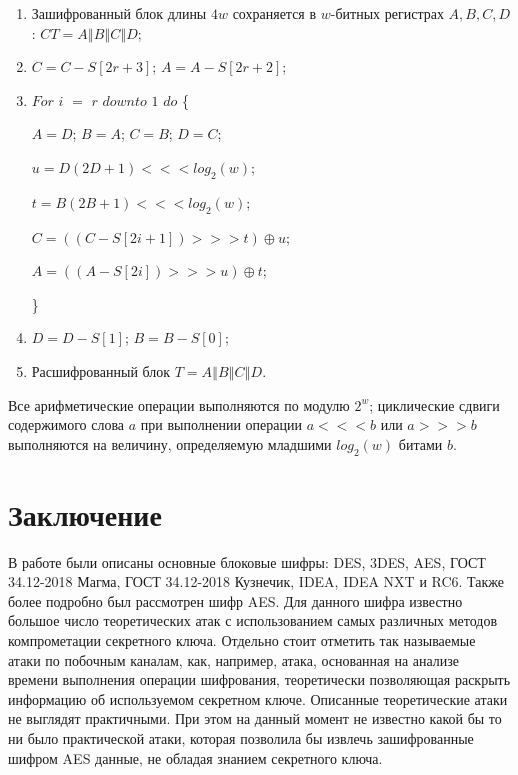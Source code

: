 \documentclass{./civarticle}
\begin{document}
\begin{enumerate}
    \item Зашифрованный блок длины $4w$ сохраняется в $w$-битных регистрах $A, B, C, D$: $CT = A \mathbin\Vert B \mathbin\Vert C \mathbin\Vert D$;
    
    \item $C = C - S[2r + 3]$; $A = A - S[2r + 2]$;

    \item $For$ $i$ $=$ $r$ $downto$ $1$ $do$ \{ 

    \hspace{0.5cm} $A = D$; $B = A$; $C = B$; $D = C$;

    \hspace{0.5cm} $u = D(2D + 1) <<< log_2(w)$;
    
    \hspace{0.5cm} $t = B(2B + 1) <<< log_2(w)$;

    \hspace{0.5cm} $C = ((C - S[2i + 1]) >>> t) \oplus u$;

    \hspace{0.5cm} $A = ((A - S[2i]) >>> u) \oplus t$;
    
\}

    \item $D = D - S[1]$; $B = B - S[0]$;

    \item Расшифрованный блок $T = A \mathbin\Vert B \mathbin\Vert C \mathbin\Vert D$.
\end{enumerate}

Все арифметические операции выполняются по модулю $2^w$; циклические сдвиги содержимого слова $a$ при выполнении операции $a <<< b$ или $a >>> b$ выполняются на величину, определяемую младшими $log_2(w)$ битами $b$.

\section{Заключение}

В работе были описаны основные блоковые шифры: DES, 3DES, AES, ГОСТ 34.12-2018 Магма, ГОСТ 34.12-2018 Кузнечик, IDEA, IDEA NXT и RC6. Также более подробно был рассмотрен шифр AES. Для данного шифра известно большое число теоретических атак с использованием самых различных методов компрометации секретного ключа. Отдельно стоит отметить так называемые атаки по побочным каналам, как, например, атака, основанная на анализе времени выполнения операции шифрования, теоретически позволяющая раскрыть информацию об используемом секретном ключе. Описанные теоретические атаки не выглядят практичными. При этом на данный момент не известно какой бы то ни было практической атаки, которая позволила бы извлечь зашифрованные шифром AES данные, не обладая знанием секретного ключа.
\end{document}
